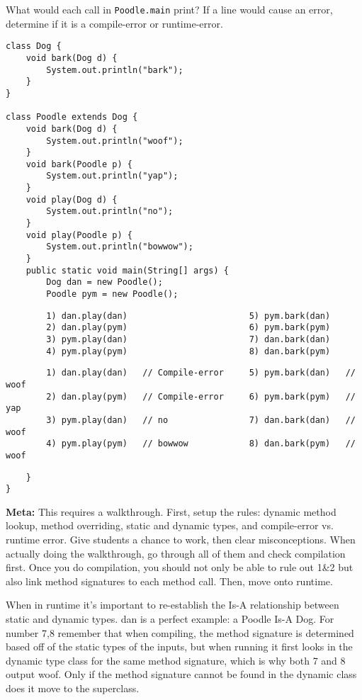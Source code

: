 \begin{blocksection}
\question What would each call in \lstinline$Poodle.main$ print? If a line
would cause an error, determine if it is a compile-error or runtime-error.

\begin{lstlisting}
class Dog {
    void bark(Dog d) {
        System.out.println("bark");
    }
}

class Poodle extends Dog {
    void bark(Dog d) {
        System.out.println("woof");
    }
    void bark(Poodle p) {
        System.out.println("yap");
    }
    void play(Dog d) {
        System.out.println("no");
    }
    void play(Poodle p) {
        System.out.println("bowwow");
    }
    public static void main(String[] args) {
        Dog dan = new Poodle();
        Poodle pym = new Poodle();
\end{lstlisting}
\ifprintanswers\else
\begin{lstlisting}
        1) dan.play(dan)                        5) pym.bark(dan)
        2) dan.play(pym)                        6) pym.bark(pym)
        3) pym.play(dan)                        7) dan.bark(dan)
        4) pym.play(pym)                        8) dan.bark(pym)
\end{lstlisting}
\fi
\begin{solution}
\begin{lstlisting}
        1) dan.play(dan)   // Compile-error     5) pym.bark(dan)   // woof
        2) dan.play(pym)   // Compile-error     6) pym.bark(pym)   // yap
        3) pym.play(dan)   // no                7) dan.bark(dan)   // woof
        4) pym.play(pym)   // bowwow            8) dan.bark(pym)   // woof
\end{lstlisting}
\end{solution}
\begin{lstlisting}
    }
}
\end{lstlisting}
\end{blocksection}

\begin{solution}
\textbf{Meta:} This requires a walkthrough. First, setup the rules: dynamic
method lookup, method overriding, static and dynamic types, and compile-error
vs. runtime error. Give students a chance to work, then clear misconceptions. When actually doing the walkthrough, go through all of them and check compilation first. Once you do compilation, you should not only be able to rule out 1&2 but also link method signatures to each method call. Then, move onto runtime. 

When in runtime it's important to re-establish the Is-A relationship between static and dynamic types. dan is a perfect example: a Poodle Is-A Dog. For number 7,8 remember that when compiling, the method signature is determined based off of the static types of the inputs, but when running it first looks in the dynamic type class for the same method signature, which is why both 7 and 8 output woof. Only if the method signature cannot be found in the dynamic class does it move to the superclass.
\end{solution}
